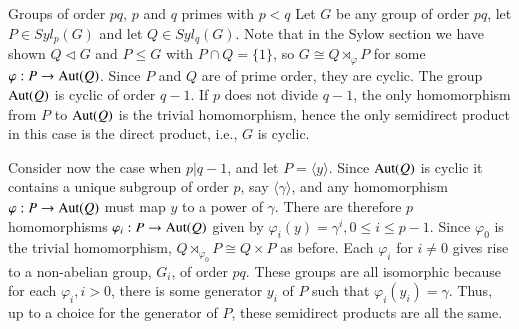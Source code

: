 \documentclass[12pt, a4paper, twoside, openright, titlepage]{book}
\begin{document}
\begin{eg}{Groups of order $pq$, $p$ and $q$ primes with $p < q$}{}
    Let $G$ be any group of order $pq$, let $P \in Syl_p(G)$ and let $Q \in Syl_q(G)$. Note that in the Sylow section we have shown $Q \triangleleft G$ and $P \leq G$ with $P\cap Q = \{1\}$, so $G \cong Q \rtimes_{\varphi}P$ for some $\varphi:P\rightarrow \operatorname{Aut}(Q)$. Since $P$ and $Q$ are of prime order, they are cyclic. The group $\operatorname{Aut}(Q)$ is cyclic of order $q-1$. If $p$ does not divide $q-1$, the only homomorphism from $P$ to $\operatorname{Aut}(Q)$ is the trivial homomorphism, hence the only semidirect product in this case is the direct product, i.e., $G$ is cyclic.

    Consider now the case when $p \vert q- 1$, and let $P = \langle y \rangle$. Since $\operatorname{Aut}(Q)$ is cyclic it contains a unique subgroup of order $p$, say $\langle \gamma \rangle$, and any homomorphism $\varphi:P\rightarrow \operatorname{Aut}(Q)$ must map $y$ to a power of $\gamma$. There are therefore $p$ homomorphisms $\varphi_i:P\rightarrow \operatorname{Aut}(Q)$ given by $\varphi_i(y) = \gamma^i, 0 \leq i \leq p -1$. Since $\varphi_0$ is the trivial homomorphism, $Q \rtimes_{\varphi_0}P \cong Q\times P$ as before. Each $\varphi_i$ for $i\neq 0$ gives rise to a non-abelian group, $G_i$, of order $pq$. These groups are all isomorphic because for each $\varphi_i, i > 0$, there is some generator $y_i$ of $P$ such that $\varphi_i(y_i) = \gamma$. Thus, up to a choice for the generator of $P$, these semidirect products are all the same.
\end{eg}
\end{document}

